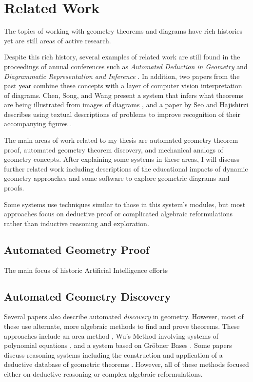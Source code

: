 \chapter{Related Work}
\label{chap:related-work}

The topics of working with geometry theorems and diagrams have rich
histories yet are still areas of active research.

Despite this rich history, several examples of related work are still
found in the proceedings of annual conferences such as \emph{Automated
  Deduction in Geometry} \cite{autoDeduction} and \emph {Diagrammatic
  Representation and Inference} \cite{diagramInference}.  In addition,
two papers from the past year combine these concepts with a layer of
computer vision interpretation of diagrams.  Chen, Song, and Wang
present a system that infers what theorems are being illustrated from
images of diagrams \cite{fromImages}, and a paper by Seo and
Hajishirzi describes using textual descriptions of problems to improve
recognition of their accompanying figures \cite{diagramUnderstanding}.

The main areas of work related to my thesis are automated geometry
theorem proof, automated geometry theorem discovery, and mechanical
analogs of geometry concepts. After explaining some systems in these
areas, I will discuss further related work including descriptions of
the educational impacts of dynamic geometry approaches and some
software to explore geometric diagrams and proofs.

Some systems use techniques similar to those in this system's modules,
but most approaches focus on deductive proof or complicated algebraic
reformulations rather than inductive reasoning and exploration.

\section{Automated Geometry Proof}

The main focus of historic Artificial Intelligence efforts

\section{Automated Geometry Discovery}
Several papers also describe automated \emph{discovery} in
geometry. However, most of these use alternate, more algebraic methods
to find and prove theorems.  These approaches include an area method
\cite{autoTools}, Wu's Method involving systems of polynomial
equations \cite{wuMethod}, and a system based on Gr\"obner Bases
\cite{grobner}.  Some papers discuss reasoning systems including the
construction and application of a deductive database of geometric
theorems \cite{deductiveDatabase}.  However, all of these methods
focused either on deductive reasoning or complex algebraic
reformulations.

